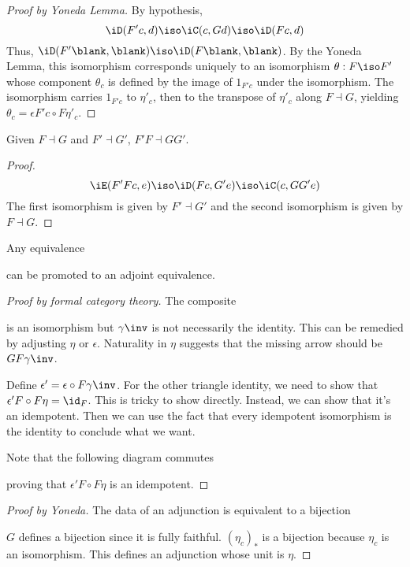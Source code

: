 \documentclass{amsart}
\begin{document}
\begin{proof}[Proof by Yoneda Lemma]
  By hypothesis,
  \[
    \iD(F'c,d) \iso \iC(c,Gd) \iso \iD(Fc,d)
  \]
  Thus, $\iD(F'\blank,\blank) \iso \iD(F\blank,\blank)$.
  By the Yoneda Lemma, this isomorphism corresponds uniquely to an isomorphism $\theta : F \iso F'$ whose component $\theta_{c}$ is defined by the image of $1_{F'c}$ under the isomorphism.
  The isomorphism carries $1_{F'c}$ to $\eta'_{c}$, then to the transpose of $\eta'_{c}$ along $F \dashv G$, yielding $\theta_{c} = \epsilon F'c \circ F\eta'_{c}$.
\end{proof}

\begin{lem}
  Given $F \dashv G$ and $F' \dashv G'$, $F'F \dashv GG'$.
  
\end{lem}
\begin{proof}
  \[
    \iE(F'Fc,e) \iso \iD(Fc,G'e) \iso \iC(c,GG'e)
  \]
  The first isomorphism is given by $F' \dashv G'$ and the second isomorphism is given by $F \dashv G$.
\end{proof}

\begin{lem}
  Any equivalence
  can be promoted to an adjoint equivalence.
\end{lem}
\begin{proof}[Proof by formal category theory]
  The composite
  
  is an isomorphism but $\gamma\inv$ is not necessarily the identity.
  This can be remedied by adjusting $\eta$ or $\epsilon$.
  Naturality in $\eta$ suggests that the missing arrow should be $GF\gamma\inv$.
  
  Define $\epsilon' = \epsilon \circ F\gamma\inv$.
  For the other triangle identity, we need to show that $\epsilon'F \circ F\eta = \id_{F}$.
  This is tricky to show directly.
  Instead, we can show that it's an idempotent.
  Then we can use the fact that every idempotent isomorphism is the identity to conclude what we want.

  Note that the following diagram commutes
  
  proving that $\epsilon'F \circ F\eta$ is an idempotent.
\end{proof}

\begin{proof}[Proof by Yoneda]
  The data of an adjunction is equivalent to a bijection
  
  $G$ defines a bijection since it is fully faithful.
  $(\eta_{c})_{*}$ is a bijection because $\eta_{c}$ is an isomorphism.
  This defines an adjunction whose unit is $\eta$.
\end{proof}
\end{document}
